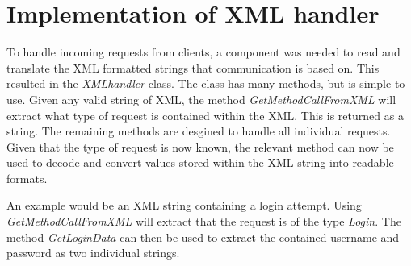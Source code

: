 \section{Implementation of XML handler}
\label{sec:xmlhandlerimpl}
To handle incoming requests from clients, a component was needed to read and translate the XML formatted strings that communication is based on. This resulted in the \textit{XMLhandler} class. The class has many methods, but is simple to use. Given any valid string of XML, the method \textit{GetMethodCallFromXML} will extract what type of request is contained within the XML. This is returned as a string. The remaining methods are desgined to handle all individual requests. Given that the type of request is now known, the relevant method can now be used to decode and convert values stored within the XML string into readable formats.

An example would be an XML string containing a login attempt. Using \textit{GetMethodCallFromXML} will extract that the request is of the type \textit{Login}. The method \textit{GetLoginData} can then be used to extract the contained username and password as two individual strings.
